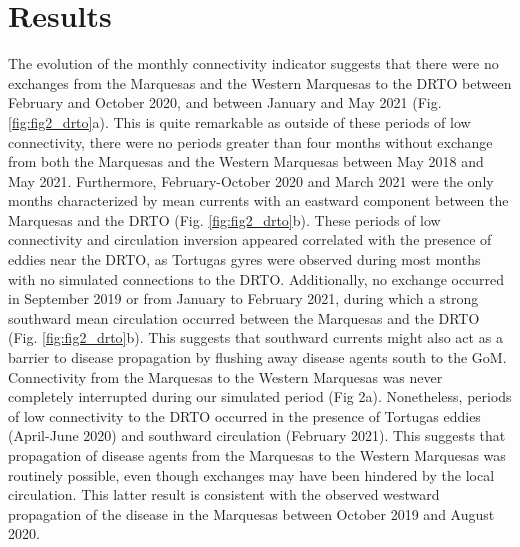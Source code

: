 \section{Results}
The evolution of the monthly connectivity indicator suggests that there were no exchanges from the Marquesas and the Western Marquesas to the DRTO between February and October 2020, and between January and May 2021 (Fig. \ref{fig:fig2_drto}a). This is quite remarkable as outside of these periods of low connectivity, there were no periods greater than four months without exchange from both the Marquesas and the Western Marquesas between May 2018 and May 2021. Furthermore, February-October 2020 and March 2021 were the only months characterized by mean currents with an eastward component between the Marquesas and the DRTO (Fig. \ref{fig:fig2_drto}b). These periods of low connectivity and circulation inversion appeared correlated with the presence of eddies near the DRTO, as Tortugas gyres were observed during most months with no simulated connections to the DRTO. Additionally, no exchange occurred in September 2019 or from January to February 2021, during which a strong southward mean circulation occurred between the Marquesas and the DRTO (Fig. \ref{fig:fig2_drto}b). This suggests that southward currents might also act as a barrier to disease propagation by flushing away disease agents south to the GoM. Connectivity from the Marquesas to the Western Marquesas was never completely interrupted during our simulated period (Fig 2a). Nonetheless, periods of low connectivity to the DRTO occurred in the presence of Tortugas eddies (April-June 2020) and southward circulation (February 2021). This suggests that propagation of disease agents from the Marquesas to the Western Marquesas was routinely possible, even though exchanges may have been hindered by the local circulation. This latter result is consistent with the observed westward propagation of the disease in the Marquesas between October 2019 and August 2020.

